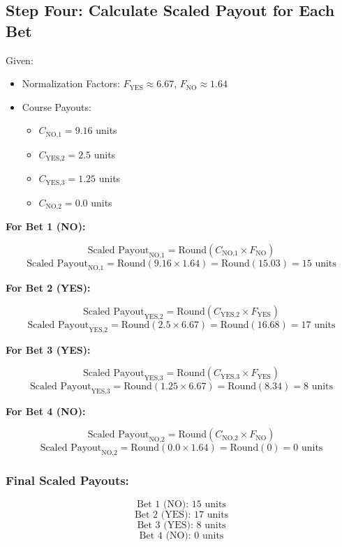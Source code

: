 \documentclass{article}
\begin{document}
\subsection*{Step Four: Calculate Scaled Payout for Each Bet}

Given:
\begin{itemize}
    \item Normalization Factors: \( F_{\text{YES}} \approx 6.67 \), \( F_{\text{NO}} \approx 1.64 \)
    \item Course Payouts:
    \begin{itemize}
        \item \( C_{\text{NO,1}} = 9.16 \) units
        \item \( C_{\text{YES,2}} = 2.5 \) units
        \item \( C_{\text{YES,3}} = 1.25 \) units
        \item \( C_{\text{NO,2}} = 0.0 \) units
    \end{itemize}
\end{itemize}

\textbf{For Bet 1 (NO):}

\[
\text{Scaled Payout}_{\text{NO,1}} = \text{Round}(C_{\text{NO,1}} \times F_{\text{NO}})
\]
\[
\text{Scaled Payout}_{\text{NO,1}} = \text{Round}(9.16 \times 1.64) = \text{Round}(15.03) = 15 \text{ units}
\]

\textbf{For Bet 2 (YES):}

\[
\text{Scaled Payout}_{\text{YES,2}} = \text{Round}(C_{\text{YES,2}} \times F_{\text{YES}})
\]
\[
\text{Scaled Payout}_{\text{YES,2}} = \text{Round}(2.5 \times 6.67) = \text{Round}(16.68) = 17 \text{ units}
\]

\textbf{For Bet 3 (YES):}

\[
\text{Scaled Payout}_{\text{YES,3}} = \text{Round}(C_{\text{YES,3}} \times F_{\text{YES}})
\]
\[
\text{Scaled Payout}_{\text{YES,3}} = \text{Round}(1.25 \times 6.67) = \text{Round}(8.34) = 8 \text{ units}
\]

\textbf{For Bet 4 (NO):}

\[
\text{Scaled Payout}_{\text{NO,2}} = \text{Round}(C_{\text{NO,2}} \times F_{\text{NO}})
\]
\[
\text{Scaled Payout}_{\text{NO,2}} = \text{Round}(0.0 \times 1.64) = \text{Round}(0) = 0 \text{ units}
\]

\subsubsection*{Final Scaled Payouts:}
\[
\text{Bet 1 (NO): } 15 \text{ units}
\]
\[
\text{Bet 2 (YES): } 17 \text{ units}
\]
\[
\text{Bet 3 (YES): } 8 \text{ units}
\]
\[
\text{Bet 4 (NO): } 0 \text{ units}
\]
\end{document}
